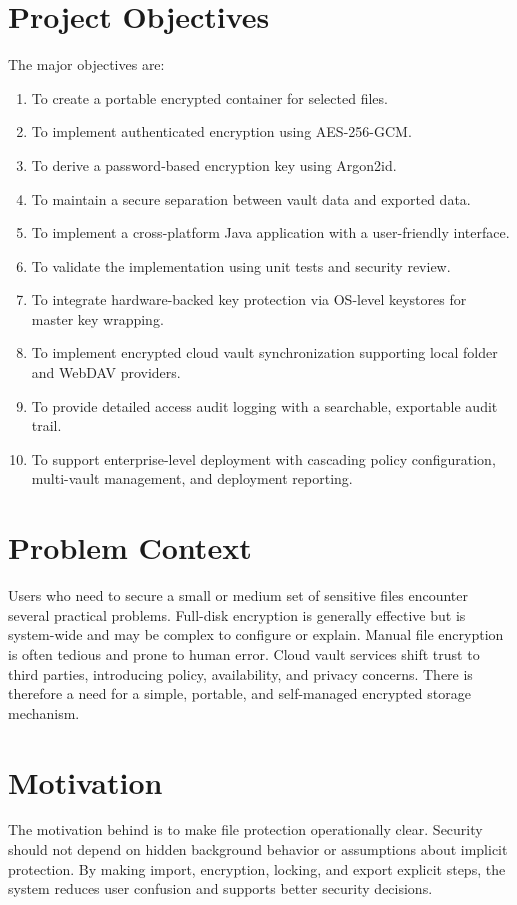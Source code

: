 \section{Project Objectives}
The major objectives are:
\begin{enumerate}[label=\arabic*.]
  \item To create a portable encrypted container for selected files.
  \item To implement authenticated encryption using AES-256-GCM.
  \item To derive a password-based encryption key using Argon2id.
  \item To maintain a secure separation between vault data and exported data.
  \item To implement a cross-platform Java application with a user-friendly interface.
  \item To validate the implementation using unit tests and security review.
  \item To integrate hardware-backed key protection via OS-level keystores for master key wrapping.
  \item To implement encrypted cloud vault synchronization supporting local folder and WebDAV providers.
  \item To provide detailed access audit logging with a searchable, exportable audit trail.
  \item To support enterprise-level deployment with cascading policy configuration, multi-vault management, and deployment reporting.
\end{enumerate}

\section{Problem Context}
Users who need to secure a small or medium set of sensitive files encounter several practical problems. Full-disk encryption is generally effective but is system-wide and may be complex to configure or explain. Manual file encryption is often tedious and prone to human error. Cloud vault services shift trust to third parties, introducing policy, availability, and privacy concerns. There is therefore a need for a simple, portable, and self-managed encrypted storage mechanism.

\section{Motivation}
The motivation behind \projname{} is to make file protection operationally clear. Security should not depend on hidden background behavior or assumptions about implicit protection. By making import, encryption, locking, and export explicit steps, the system reduces user confusion and supports better security decisions.


